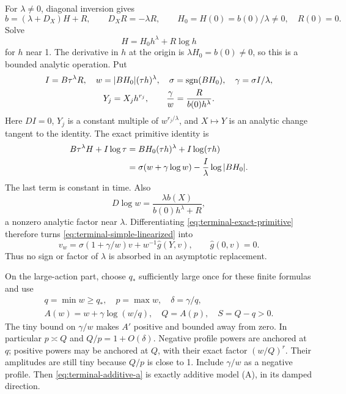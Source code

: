 For \(\lambda\ne0\), diagonal inversion gives
\begin{equation}\label{eq:terminal-simple-diagonal}
 b=(\lambda+D_X)H+R,\qquad D_XR=-\lambda R,
 \qquad H_0=H(0)=b(0)/\lambda\ne0,
 \quad R(0)=0.
\end{equation}
Solve
\begin{equation}\label{eq:terminal-h}
 H=H_0h^\lambda+R\log h
\end{equation}
for \(h\) near 1.  The derivative in \(h\) at the origin is
\(\lambda H_0=b(0)\ne0\), so this is a bounded analytic operation.
Put
\begin{equation}\label{eq:terminal-simple-w}
 \begin{gathered}
 I=B\tau^\lambda R,\quad
 w=|BH_0|(\tau h)^\lambda,
 \quad\sigma=\operatorname{sgn}(BH_0),\quad
 \gamma=\sigma I/\lambda,\\
 Y_j=X_jh^{r_j},\qquad
 \frac{\gamma}{w}=\frac{R}{b(0)h^\lambda}.
 \end{gathered}
\end{equation}
Here \(DI=0\), \(Y_j\) is a constant multiple of \(w^{r_j/\lambda}\),
and \(X\mapsto Y\) is an analytic change tangent to the identity.
The exact primitive identity is
\begin{align}\label{eq:terminal-exact-primitive}
 B\tau^\lambda H+I\log\tau
 &=BH_0(\tau h)^\lambda+I\log(\tau h)\notag\\
 &=\sigma(w+\gamma\log w)-\frac I\lambda\log|BH_0|.
\end{align}
The last term is constant in time.  Also
\begin{equation}\label{eq:terminal-clock-jacobian}
 D\log w=\frac{\lambda b(X)}{b(0)h^\lambda+R},
\end{equation}
a nonzero analytic factor near \(\lambda\).  Differentiating
\eqref{eq:terminal-exact-primitive} therefore turns
\eqref{eq:terminal-simple-linearized} into
\begin{equation}\label{eq:terminal-additive-a}
 v_w=\sigma(1+\gamma/w)v+w^{-1}\widehat g(Y,v),
 \qquad \widehat g(0,v)=0.
\end{equation}
Thus no sign or factor of \(\lambda\) is absorbed in an asymptotic
replacement.

On the large-action part, choose \(q_*\) sufficiently large once for these
finite formulas and use
\begin{equation}\label{eq:terminal-action}
 \begin{gathered}
 q=\min w\ge q_*,\quad p=\max w,\quad
 \delta=\gamma/q,\\
 A(w)=w+\gamma\log(w/q),\quad
 Q=A(p),\quad S=Q-q>0.
 \end{gathered}
\end{equation}
The tiny bound on \(\gamma/w\) makes \(A'\) positive and bounded away
from zero.  In particular \(p\asymp Q\) and
\(Q/p=1+O(\delta)\).  Negative profile powers are anchored at \(q\);
positive powers may be anchored at \(Q\), with their exact factor
\((w/Q)^r\).  Their amplitudes are still tiny because \(Q/p\) is close
to 1.  Include \(\gamma/w\) as a negative profile.  Then
\eqref{eq:terminal-additive-a} is exactly additive model (A), in its damped
direction.

